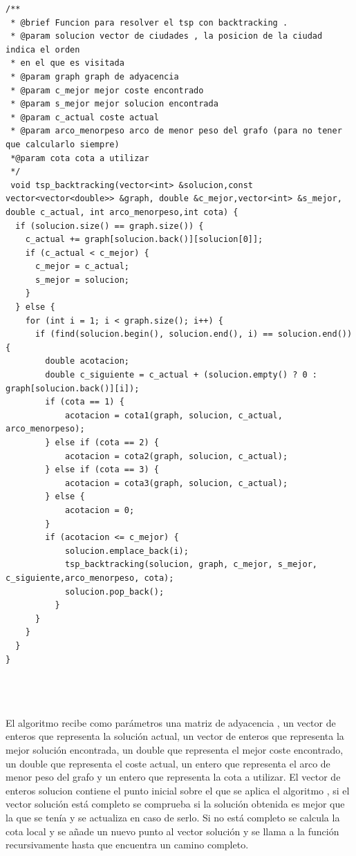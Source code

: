 \documentclass[11pt,openany]{book}
\begin{document}
\begin{lstlisting}
/**
 * @brief Funcion para resolver el tsp con backtracking .
 * @param solucion vector de ciudades , la posicion de la ciudad indica el orden
 * en el que es visitada
 * @param graph graph de adyacencia
 * @param c_mejor mejor coste encontrado
 * @param s_mejor mejor solucion encontrada
 * @param c_actual coste actual
 * @param arco_menorpeso arco de menor peso del grafo (para no tener que calcularlo siempre)
 *@param cota cota a utilizar
 */
 void tsp_backtracking(vector<int> &solucion,const vector<vector<double>> &graph, double &c_mejor,vector<int> &s_mejor, double c_actual, int arco_menorpeso,int cota) {
  if (solucion.size() == graph.size()) {
    c_actual += graph[solucion.back()][solucion[0]];
    if (c_actual < c_mejor) {
      c_mejor = c_actual;
      s_mejor = solucion;
    }
  } else {
    for (int i = 1; i < graph.size(); i++) {
      if (find(solucion.begin(), solucion.end(), i) == solucion.end()) {
        double acotacion;
        double c_siguiente = c_actual + (solucion.empty() ? 0 : graph[solucion.back()][i]);
        if (cota == 1) {
            acotacion = cota1(graph, solucion, c_actual, arco_menorpeso);
        } else if (cota == 2) {
            acotacion = cota2(graph, solucion, c_actual);
        } else if (cota == 3) {
            acotacion = cota3(graph, solucion, c_actual);
        } else {
            acotacion = 0;
        }
        if (acotacion <= c_mejor) {
            solucion.emplace_back(i);
            tsp_backtracking(solucion, graph, c_mejor, s_mejor, c_siguiente,arco_menorpeso, cota);
            solucion.pop_back();
          }
      }
    }
  }
}

  
                
    \end{lstlisting}
    El algoritmo recibe como parámetros una matriz de adyacencia , un vector de enteros que representa la solución actual, un vector de enteros que representa la mejor solución encontrada, un double que representa el mejor coste encontrado, un double que representa el coste actual, un entero que representa el arco de menor peso del grafo y un entero que representa la cota a utilizar.
    El vector de enteros solucion contiene el punto inicial sobre el que se aplica el algoritmo , si el vector solución está completo se comprueba si 
    la solución obtenida es mejor que la que se tenía y se actualiza en caso de serlo. Si no está completo se calcula la cota local y se  añade un nuevo punto al vector solución y se llama a la función recursivamente hasta que encuentra un camino completo.
    
\end{document}
